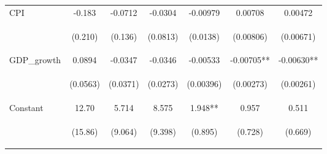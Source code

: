 \documentclass[]{article}
\begin{document}
\begin{center}
\begin{tabular}{lcccccc}
CPI & -0.183 & -0.0712 & -0.0304 & -0.00979 & 0.00708 & 0.00472 \\
\vspace{4pt} & \begin{footnotesize}(0.210)\end{footnotesize} & \begin{footnotesize}(0.136)\end{footnotesize} & \begin{footnotesize}(0.0813)\end{footnotesize} & \begin{footnotesize}(0.0138)\end{footnotesize} & \begin{footnotesize}(0.00806)\end{footnotesize} & \begin{footnotesize}(0.00671)\end{footnotesize} \\
GDP\_growth & 0.0894 & -0.0347 & -0.0346 & -0.00533 & -0.00705** & -0.00630** \\
\vspace{4pt} & \begin{footnotesize}(0.0563)\end{footnotesize} & \begin{footnotesize}(0.0371)\end{footnotesize} & \begin{footnotesize}(0.0273)\end{footnotesize} & \begin{footnotesize}(0.00396)\end{footnotesize} & \begin{footnotesize}(0.00273)\end{footnotesize} & \begin{footnotesize}(0.00261)\end{footnotesize} \\
Constant & 12.70 & 5.714 & 8.575 & 1.948** & 0.957 & 0.511 \\
 & \begin{footnotesize}(15.86)\end{footnotesize} & \begin{footnotesize}(9.064)\end{footnotesize} & \begin{footnotesize}(9.398)\end{footnotesize} & \begin{footnotesize}(0.895)\end{footnotesize} & \begin{footnotesize}(0.728)\end{footnotesize} & \begin{footnotesize}(0.669)\end{footnotesize} \\

\end{tabular}
\end{center}
\end{document}
